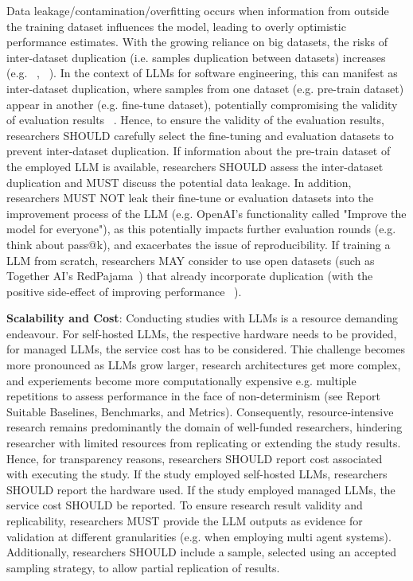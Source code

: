 Data leakage/contamination/overfitting occurs when information from outside the training dataset influences the model, leading to overly optimistic performance estimates. With the growing reliance on big datasets, the risks of inter-dataset duplication (i.e. samples duplication between datasets) increases (e.g. ~\cite{10.1145/3133908}, ~\cite{10.1145/3359591.3359735}). 
In the context of LLMs for software engineering, this can manifest as inter-dataset duplication, where samples from one dataset (e.g. pre-train dataset) appear in another (e.g. fine-tune dataset), potentially compromising the validity of evaluation results ~\cite{inter-dataset-lopez2025}. 
Hence, to ensure the validity of the evaluation results, researchers SHOULD carefully select the fine-tuning and evaluation datasets to prevent inter-dataset duplication. If information about the pre-train dataset of the employed LLM is available, researchers SHOULD assess the inter-dataset duplication and MUST discuss the potential data leakage.
In addition, researchers MUST NOT leak their fine-tune or evaluation datasets into the improvement process of the LLM (e.g. OpenAI's functionality called "Improve the model for everyone"), as this potentially impacts further evaluation rounds (e.g. think about pass@k), and exacerbates the issue of reproducibility.
If training a LLM from scratch, researchers MAY consider to use open datasets (such as Together AI's RedPajama~\cite{together2023redpajama}) that already incorporate duplication (with the positive side-effect of improving performance ~\cite{lee-etal-2022-deduplicating}).

\textbf{Scalability and Cost}:
Conducting studies with LLMs is a resource demanding endeavour. For self-hosted LLMs, the respective hardware needs to be provided, for managed LLMs, the service cost has to be considered. Thie challenge becomes more pronounced as LLMs grow larger, research architectures get more complex, and experiements become more computationally expensive e.g. multiple repetitions to assess performance in the face of non-determinism (see Report Suitable Baselines, Benchmarks, and Metrics).
Consequently, resource-intensive research remains predominantly the domain of well-funded researchers, hindering researcher with limited resources from replicating or extending the study results.
Hence, for transparency reasons, researchers SHOULD report cost associated with executing the study. If the study employed self-hosted LLMs, researchers SHOULD report the hardware used. If the study employed managed LLMs, the service cost SHOULD be reported.
To ensure research result validity and replicability, researchers MUST provide the LLM outputs as evidence for validation at different granularities (e.g. when employing multi agent systems). Additionally, researchers SHOULD include a sample, selected using an accepted sampling strategy, to allow partial replication of results.


